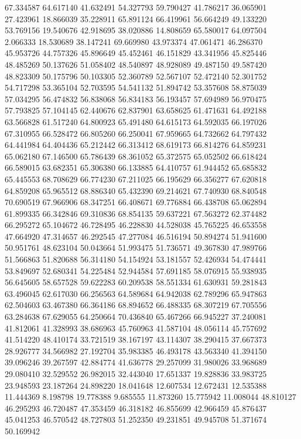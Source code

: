 67.334587
64.617140
41.632491
54.327793
59.790427
41.786217
36.065901
27.423961
18.866039
35.228911
65.891124
66.419961
56.664249
49.133220
53.769156
19.540676
42.918695
38.020886
14.808659
65.580017
64.097504
2.066333
18.530689
38.147241
69.669980
43.973374
47.061471
46.286370
45.953726
44.757326
45.896649
45.452461
46.151829
43.341956
45.825446
48.485269
50.137626
51.058402
48.540897
48.928089
49.487150
49.587420
48.823309
50.175796
50.103305
52.360789
52.567107
52.472140
52.301752
54.717298
53.365104
52.703595
54.541132
51.894742
53.357608
58.875039
57.034295
56.474832
56.838068
56.834183
56.193457
57.694989
56.970475
57.793825
57.104145
62.440676
62.837901
63.658625
61.471631
64.492188
63.566828
61.517240
64.800923
65.491480
64.615173
64.592035
66.197026
67.310955
66.528472
66.805260
66.250041
67.959665
64.732662
64.797432
64.441984
64.404436
65.212442
66.313412
68.619173
66.814276
64.859231
65.062180
67.146500
65.786439
68.361052
65.372575
65.052502
66.618424
66.589015
63.682351
65.306380
66.133885
64.410757
61.944452
65.685832
65.445553
68.708629
66.774230
67.211025
66.195629
66.356277
67.620818
64.859208
65.965512
68.886340
65.432390
69.214621
67.740930
68.840548
70.690519
67.966906
68.347251
66.408671
69.776884
66.438708
65.062894
61.899335
66.342846
69.310836
68.854135
59.637221
67.563272
62.374482
66.295272
65.104672
46.728495
46.228830
44.528038
45.765225
46.653558
47.664920
47.314657
46.292545
47.277084
46.516194
50.894274
51.941600
50.951761
48.623104
50.043664
51.993475
51.736571
49.367830
47.989766
51.566863
51.820688
56.314180
54.154924
53.181557
52.426934
54.474441
53.849697
52.680341
54.225484
52.944584
57.691185
58.076915
55.938935
56.645605
58.657528
59.622283
60.209538
58.551334
61.630931
59.281843
63.496045
62.617030
66.256563
64.589684
64.942038
62.789296
65.947863
62.504603
63.467380
66.364186
68.894652
66.488335
68.307219
67.705556
63.284638
67.629055
64.250664
70.436840
65.467266
66.945227
37.240081
41.812061
41.328993
38.686963
45.760963
41.587104
48.056114
45.757692
41.514220
48.410174
33.721519
38.167197
43.114307
38.290415
37.667373
28.926777
34.566982
27.192704
35.983385
46.493178
43.563340
41.394150
39.096246
39.267597
42.884774
41.636778
29.257099
31.980026
33.968689
29.080410
32.529552
26.982015
32.443040
17.651337
19.828836
33.983725
23.948593
23.187264
24.898220
18.041648
12.607534
12.672431
12.535388
11.444369
8.198798
19.778388
9.685555
11.873260
15.775942
11.008044
48.810127
46.295293
46.720487
47.353459
46.318182
46.855699
42.966459
45.876437
45.041253
46.570542
48.727803
51.252350
49.231851
49.945708
51.371674
50.169942
